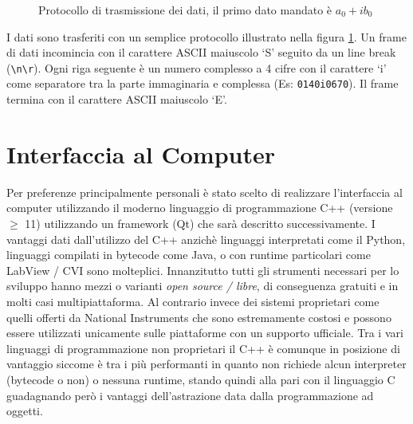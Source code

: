 \begin{figure}[H] \centering
    \caption[Protocollo di trasmissione dei dati]{
        Protocollo di trasmissione dei dati, il primo dato mandato \`e
        \(a_0+ib_0\)
        \label{fig:proto}
    }
\end{figure}
I dati sono trasferiti con un semplice protocollo illustrato nella figura
\ref{fig:proto}. Un frame di dati incomincia con il carattere ASCII maiuscolo
`S' seguito da un line break (\texttt{\textbackslash n\textbackslash r}). Ogni
riga seguente \`e un numero complesso a 4 cifre con il carattere `i' come
separatore tra la parte immaginaria e complessa (Es: \texttt{0140i0670}). Il
frame termina con il carattere ASCII maiuscolo `E'.

\section{Interfaccia al Computer}
Per preferenze principalmente personali \`e stato scelto di realizzare
l'interfaccia al computer utilizzando il moderno linguaggio di programmazione
C++ (versione \(\geq\) 11) utilizzando un framework (Qt) che sar\`a descritto
successivamente.  I vantaggi dati dall'utilizzo del C++ anzich\`e linguaggi
interpretati come il Python, linguaggi compilati in bytecode come Java, o con
runtime particolari come LabView / CVI sono molteplici. Innanzitutto tutti gli
strumenti necessari per lo sviluppo hanno mezzi o varianti \emph{open source /
libre}, di conseguenza gratuiti e in molti casi multipiattaforma. Al contrario
invece dei sistemi proprietari come quelli offerti da National Instruments che
sono estremamente costosi e possono essere utilizzati unicamente sulle
piattaforme con un supporto ufficiale.  Tra i vari linguaggi di programmazione
non proprietari il C++ \`e comunque in posizione di vantaggio siccome \`e tra
i pi\`u performanti in quanto non richiede alcun interpreter (bytecode o non)
o nessuna runtime, stando quindi alla pari con il linguaggio C guadagnando
per\`o i vantaggi dell'astrazione data dalla programmazione ad oggetti.

